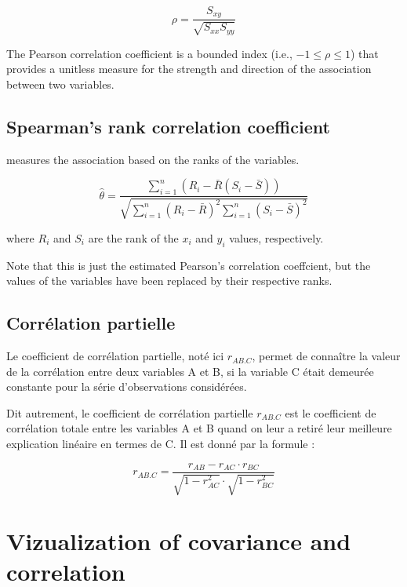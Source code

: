 \documentclass[
]{report}
\begin{document}
\[\rho=\frac{S_{xy}}{\sqrt{S_{xx}S_{yy}}}\]

The Pearson correlation coefficient is a bounded index (i.e., \(-1 \leq \rho \leq 1\)) that provides a unitless measure for the strength and direction of the association between two variables.

\hypertarget{spearmans-rank-correlation-coefficient}{%
\section{Spearman's rank correlation coefficient}\label{spearmans-rank-correlation-coefficient}}

measures the association based on the ranks of the variables.

\[\hat{\theta}=\frac{\sum_{i=1}^n(R_i-\bar{R}(S_i-\bar{S}))}{\sqrt{\sum_{i=1}^n(R_i-\bar{R})^2\sum_{i=1}^n(S_i-\bar{S})^2}}\]

where \(R_i\) and \(S_i\) are the rank of the \(x_i\) and \(y_i\) values, respectively.

Note that this is just the estimated Pearson's correlation coeffcient, but the values of the variables have been replaced by their respective ranks.

\hypertarget{corruxe9lation-partielle}{%
\section{Corrélation partielle}\label{corruxe9lation-partielle}}

Le coefficient de corrélation partielle, noté ici \(r_{AB.C}\), permet de connaître la valeur de la corrélation entre deux variables A et B, si la variable C était demeurée constante pour la série d'observations considérées.

Dit autrement, le coefficient de corrélation partielle \(r_{AB.C}\) est le coefficient de corrélation totale entre les variables A et B quand on leur a retiré leur meilleure explication linéaire en termes de C. Il est donné par la formule :

\[r_{AB.C}=\frac{r_{AB}-r_{AC} \cdot r_{BC}}{\sqrt{1-r_{AC}^2} \cdot \sqrt{1-r_{BC}^2}}\]

\hypertarget{vizualization-of-covariance-and-correlation}{%
\chapter{Vizualization of covariance and correlation}\label{vizualization-of-covariance-and-correlation}}
\end{document}
